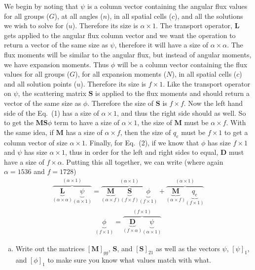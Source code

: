 \documentclass[10pt]{article}
\begin{document}
We begin by noting that $\psi$ is a column vector containing the angular flux values for all groups ($G$), at all angles ($n$), in all spatial cells ($c$), and all the solutions we wish to solve for ($u$). Therefore its size is $\alpha \times 1$. The transport operator, $\textbf{L}$ gets applied to the angular flux column vector and we want the operation to return a vector of the same size as $\psi$, therefore it will have a size of $\alpha \times \alpha$. The flux moments will be similar to the angular flux, but instead of angular moments, we have expansion moments. Thus $\phi$ will be a column vector containing the flux values for all groups ($G$), for all expansion moments ($N$), in all spatial cells ($c$) and all solution points ($u$). Therefore its size is $f \times 1$. Like the transport operator on $\psi$, the scattering matrix $\textbf{S}$ is applied to the flux moments and should return a vector of the same size as $\phi$. Therefore the size of $\textbf{S}$ is $f \times f$. Now the left hand side of the Eq.~(1) has a size of $\alpha \times 1$, and thus the right side should as well. So to get the $\textbf{MS}\phi$ term to have a size of $\alpha \times 1$, the size of $\textbf{M}$ must be $\alpha \times f$. With the same idea, if $\textbf{M}$ has a size of $\alpha \times f$, then the size of $q_e$ must be $f \times 1$ to get a column vector of size $\alpha \times 1$. Finally, for Eq.~(2), if we know that $\phi$ has size $f \times 1$ and $\psi$ has size $\alpha \times 1$, thus in order for the left and right sides to equal, $\textbf{D}$ must have a size of $ f \times \alpha$. Putting this all together, we can write (where again $\alpha = 1536$ and $f = 1728$)
%
\begin{align*}
	   \overbrace{ \underbrace{\textbf{L}}_{(\alpha \times \alpha)} \underbrace{\psi}_{(\alpha \times 1)} }^{(\alpha \times 1)} = \overbrace{  \underbrace{\textbf{M}}_{(\alpha \times f)}  \underbrace{\textbf{S}}_{(f \times f)} \underbrace{\phi}_{(f \times 1)} }^{(\alpha \times 1)} + \overbrace{ \underbrace{\textbf{M}}_{(\alpha \times f)} \underbrace{q_e}_{(f \times 1)} }^{(\alpha \times 1)}
\end{align*}
\vspace{-10pt}
\begin{align*}
	\underbrace{\phi}_{(f \times 1)} = \overbrace{\underbrace{\textbf{D}}_{(f \times \alpha)} \underbrace{\psi}_{(\alpha \times 1)}}^{(f \times 1)}
\end{align*}

%
%
%

\vspace{10pt}
\begin{enumerate}[(b)]
\item Write out the matrices $[\textbf{M}]_{gg}$, $\textbf{S}$, and $[\textbf{S}]_{21}$ as well as the vectors $\psi$, $[\psi]_1$, and $[\phi]_1$ to make sure you know what values match with what.
\end{enumerate}
\end{document}

